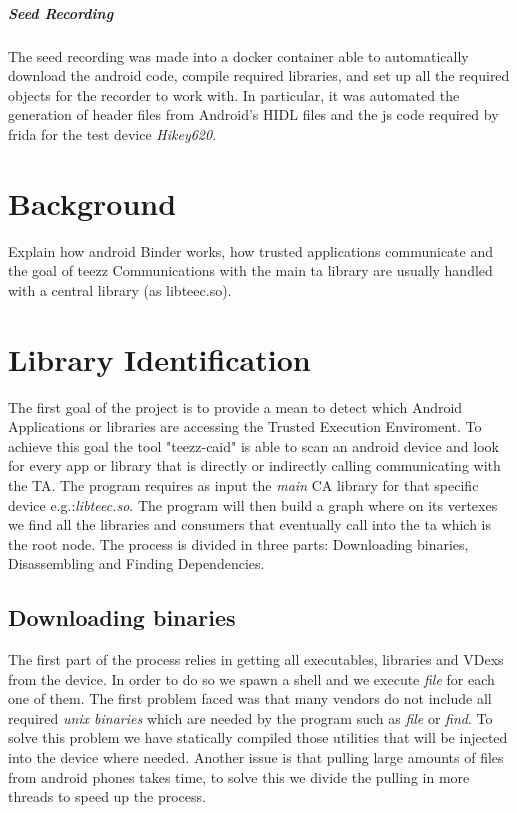 \documentclass[a4paper,11pt,oneside]{report}
\begin{document}
\paragraph{Seed Recording}
The seed recording was made into a docker container able to automatically
download the android code, compile required libraries, and set up all the
required objects for the recorder to work with. In particular, it was automated
the generation of header files from Android's HIDL files and the js code required
by frida for the test device \emph{Hikey620}.

\chapter{Background}
Explain how android Binder works, how trusted applications communicate and
the goal of teezz
Communications with the main ta
library are usually handled with a central library (as libteec.so).
\chapter{Library Identification}
The first goal of the project is to provide a mean to detect which Android
Applications or libraries are accessing the Trusted Execution Enviroment.
To achieve this goal the tool "teezz-caid" is able to
scan an android device and look for every app or library that is directly or
indirectly calling communicating with the TA. The program requires as input
the \emph{main} CA library for that specific device e.g.:\emph{libteec.so}.
The program will then build a graph where on its vertexes we find all the
libraries and consumers that eventually call into the ta which is the root node.
The process is divided in three parts:
Downloading binaries, Disassembling and Finding Dependencies.
\section{Downloading binaries}
The first part of the process relies in getting all executables, libraries
and VDexs from the device. In order to do so we spawn a shell and we execute
\emph{file} for each one of them. The first problem faced was that many vendors
do not include all required \emph{unix binaries} which are needed by the program
such as \emph{file} or \emph{find}. To solve this problem we have statically
compiled those utilities that will be injected into the device where needed.
Another issue is that pulling large amounts of files from android phones takes
time, to solve this we divide the pulling in more threads to speed up the
process.
\end{document}
